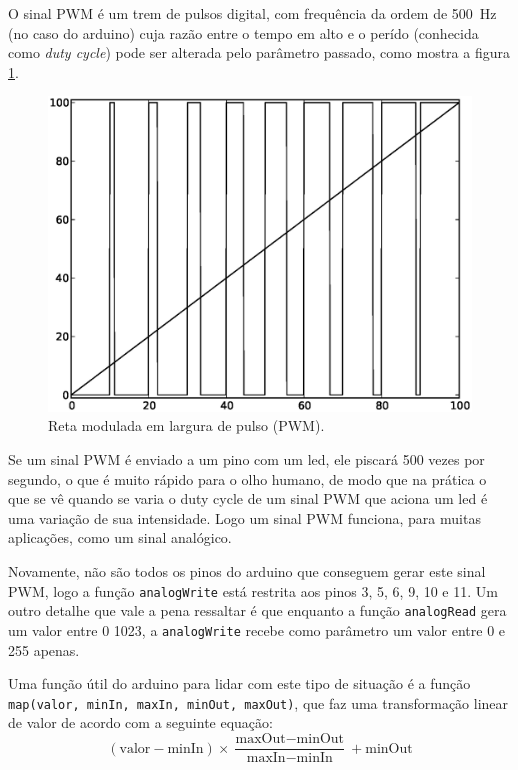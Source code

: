 O sinal PWM é um trem de pulsos digital, com frequência da ordem de \SI{500}{Hz} (no caso do arduino) cuja razão entre o tempo em alto e o perído (conhecida como \emph{duty cycle}) pode ser alterada pelo parâmetro passado, como mostra a figura \ref{fig:pwm}.
\begin{figure}[hbt]
	\centering
	\includegraphics[width=\textwidth]{figuras/pwm}
	\caption{Reta modulada em largura de pulso (PWM).}
	\label{fig:pwm}
\end{figure}	
 Se um sinal PWM é enviado a um pino com um led, ele piscará 500 vezes por segundo, o que é muito rápido para o olho humano, de modo que na prática o que se vê quando se varia o duty cycle de um sinal PWM que aciona um led é uma variação de sua intensidade. Logo um sinal PWM funciona, para muitas aplicações, como um sinal analógico.

Novamente, não são todos os pinos do arduino que conseguem gerar este sinal PWM, logo a função \lstinline|analogWrite| está restrita aos pinos 3, 5, 6, 9, 10 e 11. Um outro detalhe que vale a pena ressaltar é que enquanto a função \lstinline|analogRead| gera um valor entre 0  1023, a \lstinline|analogWrite| recebe como parâmetro um valor entre 0 e 255 apenas.

Uma função útil do arduino para lidar com este tipo de situação é a função \lstinline|map(valor, minIn, maxIn, minOut, maxOut)|, que faz uma transformação linear de valor de acordo com a seguinte equação:
\begin{equation*}
(\text{valor} - \text{minIn}) \times \frac{\text{maxOut} - \text{minOut}}{\text{maxIn} - \text{minIn}} + \text{minOut}
\end{equation*}

